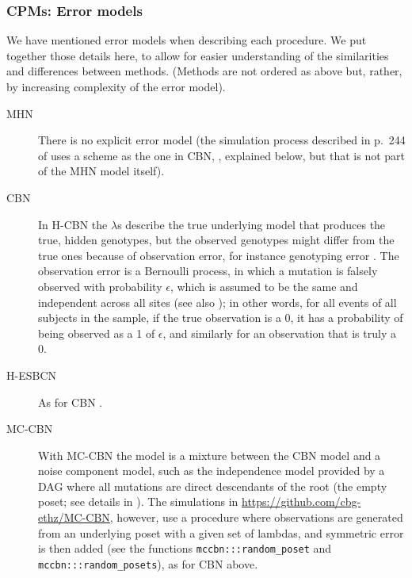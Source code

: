 \documentclass[a4paper,11pt]{article}
\begin{document}
  
\subsubsection{CPMs: Error models}
\label{error_models}

We have mentioned error models when describing each procedure. We put together those details here, to allow for easier understanding of the similarities and differences between methods. (Methods are not ordered as above but, rather, by increasing complexity of the error model).

\begin{description}
  
\item[MHN] There is no explicit error model (the simulation process described in p.~244 of \citealp{schill2020modelling} uses a scheme as the one in CBN, \citealp{gerstung2009quantifying}, explained below, but that is not part of the MHN model itself).

\item[CBN] In H-CBN the $\lambda$s describe the true underlying model that produces the true, hidden genotypes, but the observed genotypes might differ from the true ones because of observation error, for instance genotyping error  \cite[p.~2810]{gerstung2009quantifying}.  The observation error is a Bernoulli process, in which a mutation is falsely observed with probability $\epsilon$,   which is assumed to be the same and independent across all sites (see also \citealp[p.~2319]{Sakoparnig2012}); in other words, for all events of all subjects in the sample, if the true observation is a 0, it has a probability of being observed as a 1 of $\epsilon$, and similarly for an observation that is truly a 0.

\item[H-ESBCN] As for CBN \cite[p.~756]{angaroni2021}.

\item[MC-CBN] With MC-CBN the model is a mixture between the CBN model and a noise component model, such as the independence model provided by a DAG where all mutations are direct descendants of the root (the empty poset; see details in \citealp[p.~i730-i731]{montazeri2016large}). The simulations in \url{https://github.com/cbg-ethz/MC-CBN}, however, use a procedure where observations are generated from an underlying poset with a given set of lambdas, and symmetric error is then added (see the functions \texttt{mccbn:::random\_poset} and \texttt{mccbn:::random\_posets}), as for CBN above.


\end{description}
\end{document}
